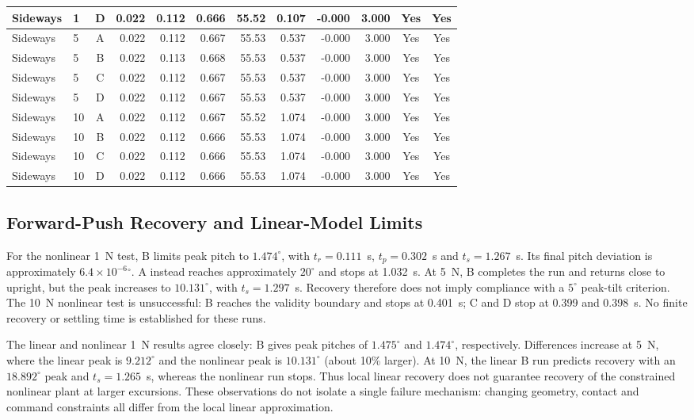 \begin{table}[!t]
\begin{tabular}{@{}llcrrrrrrrcc@{}}
Sideways & 1 & D & 0.022 & 0.112 & 0.666 & 55.52 & 0.107 & -0.000 & 3.000 & Yes & Yes\\
\midrule
Sideways & 5 & A & 0.022 & 0.112 & 0.667 & 55.53 & 0.537 & -0.000 & 3.000 & Yes & Yes\\
Sideways & 5 & B & 0.022 & 0.113 & 0.668 & 55.53 & 0.537 & -0.000 & 3.000 & Yes & Yes\\
Sideways & 5 & C & 0.022 & 0.112 & 0.667 & 55.53 & 0.537 & -0.000 & 3.000 & Yes & Yes\\
Sideways & 5 & D & 0.022 & 0.112 & 0.667 & 55.53 & 0.537 & -0.000 & 3.000 & Yes & Yes\\
\midrule
Sideways & 10 & A & 0.022 & 0.112 & 0.667 & 55.52 & 1.074 & -0.000 & 3.000 & Yes & Yes\\
Sideways & 10 & B & 0.022 & 0.112 & 0.666 & 55.53 & 1.074 & -0.000 & 3.000 & Yes & Yes\\
Sideways & 10 & C & 0.022 & 0.112 & 0.666 & 55.53 & 1.074 & -0.000 & 3.000 & Yes & Yes\\
Sideways & 10 & D & 0.022 & 0.112 & 0.666 & 55.53 & 1.074 & -0.000 & 3.000 & Yes & Yes\\
\bottomrule\end{tabular}\end{table}

\subsection{Forward-Push Recovery and Linear-Model Limits}
For the nonlinear 1~N test, B limits peak pitch to $1.474^\circ$, with $t_r=0.111$~s, $t_p=0.302$~s and $t_s=1.267$~s. Its final pitch deviation is approximately $6.4\times10^{-6}\!{}^\circ$. A instead reaches approximately $20^\circ$ and stops at 1.032~s. At 5~N, B completes the run and returns close to upright, but the peak increases to $10.131^\circ$, with $t_s=1.297$~s. Recovery therefore does not imply compliance with a $5^\circ$ peak-tilt criterion. The 10~N nonlinear test is unsuccessful: B reaches the validity boundary and stops at 0.401~s; C and D stop at 0.399 and 0.398~s. No finite recovery or settling time is established for these runs.

The linear and nonlinear 1~N results agree closely: B gives peak pitches of $1.475^\circ$ and $1.474^\circ$, respectively. Differences increase at 5~N, where the linear peak is $9.212^\circ$ and the nonlinear peak is $10.131^\circ$ (about 10\% larger). At 10~N, the linear B run predicts recovery with an $18.892^\circ$ peak and $t_s=1.265$~s, whereas the nonlinear run stops. Thus local linear recovery does not guarantee recovery of the constrained nonlinear plant at larger excursions. These observations do not isolate a single failure mechanism: changing geometry, contact and command constraints all differ from the local linear approximation.


